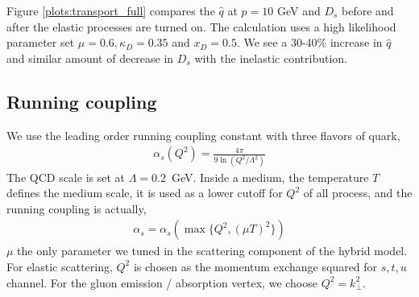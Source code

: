 \documentclass[aps, prc, reprint, amsmath, groupedaddress, nofootinbib]{revtex4-1}
\begin{document}
Figure \ref{plots:transport_full} compares the $\hat{q}$ at $p=10$ GeV and $D_s$ before and after the elastic processes are turned on.
The calculation uses a high likelihood parameter set $\mu = 0.6, \kappa_D = 0.35$ and $x_D = 0.5$. 
We see a 30-40\% increase in $\hat{q}$ and similar amount of decrease in $D_s$ with the inelastic contribution.
\begin{appendices}
\section{Running coupling}
\label{appendix:alphas}
We use the leading order running coupling constant with three flavors of quark,
\begin{eqnarray}
\alpha_s(Q^2) = \frac{4\pi}{9 \ln\left(Q^2/\Lambda^2\right) }
\end{eqnarray}
The QCD scale is set at $\Lambda = 0.2$~GeV.
Inside a medium, the temperature $T$ defines the medium scale, it is used as a lower cutoff for $Q^2$ of all process, and the running coupling is actually,
\begin{eqnarray}
\alpha_s = \alpha_s(\max\{Q^2,(\mu T)^2\})
\end{eqnarray}
$\mu$ the only parameter we tuned in the scattering component of the hybrid model.
For elastic scattering, $Q^2$ is chosen as the momentum exchange squared for $s,t,u$ channel.
For the gluon emission / absorption vertex, we choose $Q^2 = k_\perp^2$.

\end{appendices}
\end{document}
